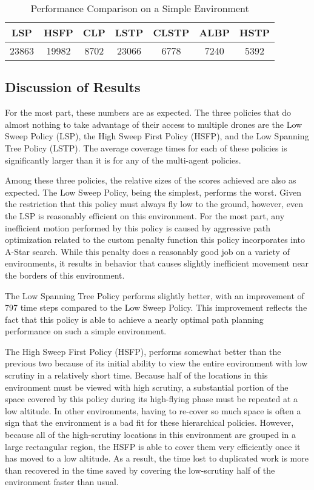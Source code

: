 \begin{table}[h]
\begin{center}
 \begin{tabular}{||c c c c c c c ||}
 \hline
 LSP   & HSFP  & CLP  & LSTP  & CLSTP & ALBP & HSTP \\
 \hline
 23863 & 19982 & 8702 & 23066 & 6778  & 7240 & 5392 \\
 \hline
 \end{tabular}
\end{center}
\caption{Performance Comparison on a Simple Environment}
\end{table}

\subsection{Discussion of Results}

For the most part, these numbers are as expected. The three policies that do almost nothing to take advantage of their access to multiple drones are the Low Sweep Policy (LSP), the High Sweep First Policy (HSFP), and the Low Spanning Tree Policy (LSTP). The average coverage times for each of these policies is significantly larger than it is for any of the multi-agent policies.

Among these three policies, the relative sizes of the scores achieved are also as expected. The Low Sweep Policy, being the simplest, performs the worst. Given the restriction that this policy must always fly low to the ground, however, even the LSP is reasonably efficient on this environment. For the most part, any inefficient motion performed by this policy is caused by aggressive path optimization related to the custom penalty function this policy incorporates into A-Star search. While this penalty does a reasonably good job on a variety of environments, it results in behavior that causes slightly inefficient movement near the borders of this environment.

The Low Spanning Tree Policy performs slightly better, with an improvement of 797 time steps compared to the Low Sweep Policy. This improvement reflects the fact that this policy is able to achieve a nearly optimal path planning performance on such a simple environment.

The High Sweep First Policy (HSFP), performs somewhat better than the previous two because of its initial ability to view the entire environment with low scrutiny in a relatively short time. Because half of the locations in this environment must be viewed with high scrutiny, a substantial portion of the space covered by this policy during its high-flying phase must be repeated at a low altitude. In other environments, having to re-cover so much space is often a sign that the environment is a bad fit for these hierarchical policies. However, because all of the high-scrutiny locations in this environment are grouped in a large rectangular region, the HSFP is able to cover them very efficiently once it has moved to a low altitude. As a result, the time lost to duplicated work is more than recovered in the time saved by covering the low-scrutiny half of the environment faster than usual.

